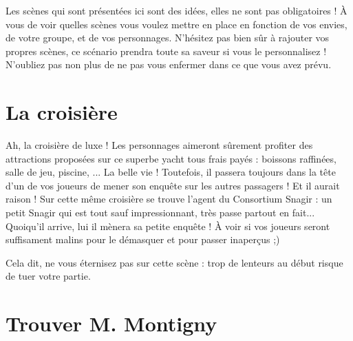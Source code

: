 \begin{multicols*}{2}

Les scènes qui sont présentées ici sont des idées, elles ne sont pas obligatoires ! À vous de voir quelles scènes vous voulez mettre en place en fonction de vos envies, de votre groupe, et de vos personnages. N'hésitez pas bien sûr à rajouter vos propres scènes, ce scénario prendra toute sa saveur si vous le personnalisez ! N'oubliez pas non plus de ne pas vous enfermer dans ce que vous avez prévu.

\section{La croisière}

Ah, la croisière de luxe ! Les personnages aimeront sûrement profiter des attractions proposées sur ce superbe yacht tous frais payés : boissons raffinées, salle de jeu, piscine, ... La belle vie ! Toutefois, il passera toujours dans la tête d'un de vos joueurs de mener son enquête sur les autres passagers ! Et il aurait raison ! Sur cette même croisière se trouve l'agent du Consortium Snagir : un petit Snagir qui est tout sauf impressionnant, très passe partout en fait... Quoiqu'il arrive, lui il mènera sa petite enquête ! À voir si vos joueurs seront suffisament malins pour le démasquer et pour passer inaperçus ;)

Cela dit, ne vous éternisez pas sur cette scène : trop de lenteurs au début risque de tuer votre partie.

\section{Trouver M. Montigny}


\end{multicols*}
